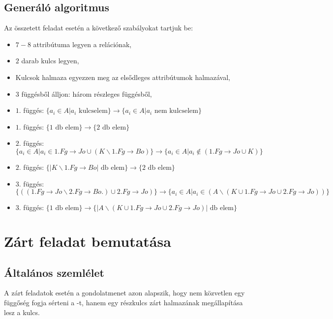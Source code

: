 \subsection{Generáló algoritmus}
Az összetett feladat esetén a következő szabályokat tartjuk be:
\begin{itemize}
    \item $7-8$ attribútuma legyen a relációnak,
    \item $2$ darab kulcs legyen,
    \item Kulcsok halmaza egyezzen meg az elsődleges attribútumok halmazával,
    \item $3$ függésből álljon: három részleges függésből,
    \item $1.$ függés: $\big\{ a_i \in A \big| a_i \text{ kulcselem}  \big\} \longrightarrow \big\{  a_i \in A \big| a_i \text{ nem kulcselem}  \big\}$ 
    \item $1.$ függés: $\big \{ 1 \text{ db elem} \big\} \longrightarrow \big\{ 2 \text{ db elem} \big \}$
    \item $2.$ függés: $\big\{ a_i \in A \big| a_i \in 1.Fg \rightarrow Jo \cup (K \backslash 1.Fg \rightarrow Bo )  \big\} \longrightarrow \big\{  a_i \in A \big| a_i \not \in (1.Fg \rightarrow Jo \cup K)  \big\}$ 
    \item $2.$ függés: $\big \{ |K \backslash 1.Fg \rightarrow Bo| \text{ db elem} \big\} \longrightarrow \big\{ 2 \text{ db elem} \big \}$
    \item $3.$ függés: $\big\{ ((1.Fg \rightarrow Jo \backslash 2.Fg \rightarrow Bo.) \cup  2.Fg \rightarrow Jo) \big\} \longrightarrow \big\{  a_i \in A  \big| a_i \in (A \backslash (K \cup 1.Fg \rightarrow Jo \cup 2. Fg \rightarrow Jo)) \big\}$
    \item $3.$ függés: $\big \{ 1 \text{ db elem} \big\} \longrightarrow \big\{|A \backslash (K \cup 1.Fg \rightarrow Jo \cup 2. Fg \rightarrow Jo)| \text{ db elem} \big \}$
\end{itemize}

\section{Zárt feladat bemutatása}

\subsection{Általános szemlélet}

A zárt feladatok esetén a gondolatmenet azon alapszik, hogy nem közvetlen egy függőség fogja sérteni a \nfk-t, hanem egy részkulcs zárt halmazának megállapítása lesz a kulcs. 

